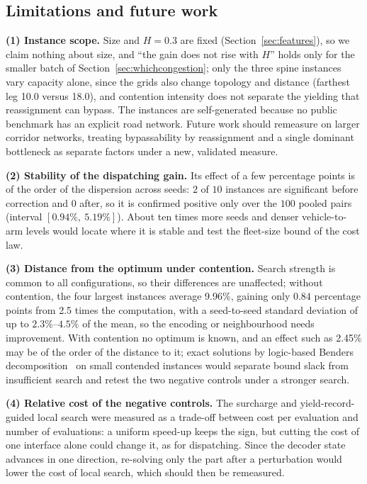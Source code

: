 \documentclass[preprint,review,12pt,authoryear]{elsarticle}
\newcommand{\NCases}{10}
\newcommand{\NPairs}{100}
\newcommand{\GainProbeLoop}{2.45\%}      %
\newcommand{\CIProbeLoop}{$[0.94\%,\ 5.19\%]$}
\newcommand{\CellsSigProbe}{2}
\newcommand{\CellsSigProbeAdj}{0}
\newcommand{\LegDumbbell}{10.0}          %
\newcommand{\LegGrid}{18.0}              %
\newcommand{\PubGapBig}{9.96\%}           %
\newcommand{\PubBudgetRatio}{2.5}
\newcommand{\PubBudgetGainPP}{0.84}       %
\newcommand{\PubCvBig}{$2.3\%$--$4.5\%$} %
\begin{document}
\subsection{Limitations and future work}
\label{sec:limitations}
\label{sec:future_work}

\textbf{(1) Instance scope.}
Size and $H=0.3$ are fixed (Section~\ref{sec:features}), so we claim nothing about size, and ``the gain does not rise with $H$'' holds only for the smaller batch of Section~\ref{sec:whichcongestion}; only the three spine instances vary capacity alone, since the grids also change topology and distance (farthest leg \LegDumbbell{} versus \LegGrid{}), and contention intensity does not separate the yielding that reassignment can bypass. The instances are self-generated because no public benchmark has an explicit road network. Future work should remeasure on larger corridor networks, treating bypassability by reassignment and a single dominant bottleneck as separate factors under a new, validated measure.

\textbf{(2) Stability of the dispatching gain.}
Its effect of a few percentage points is of the order of the dispersion across seeds: $\CellsSigProbe$ of $\NCases$ instances are significant before correction and $\CellsSigProbeAdj$ after, so it is confirmed positive only over the $\NPairs$ pooled pairs (interval \CIProbeLoop{}). About ten times more seeds and denser vehicle-to-arm levels would locate where it is stable and test the fleet-size bound of the cost law.

\textbf{(3) Distance from the optimum under contention.}
Search strength is common to all configurations, so their differences are unaffected; without contention, the four largest instances average \PubGapBig{}, gaining only $\PubBudgetGainPP$ percentage points from \PubBudgetRatio{} times the computation, with a seed-to-seed standard deviation of up to \PubCvBig{} of the mean, so the encoding or neighbourhood needs improvement. With contention no optimum is known, and an effect such as \GainProbeLoop{} may be of the order of the distance to it; exact solutions by logic-based Benders decomposition~\citep{vanos2026exact} on small contended instances would separate bound slack from insufficient search and retest the two negative controls under a stronger search.

\textbf{(4) Relative cost of the negative controls.}
The surcharge and yield-record-guided local search were measured as a trade-off between cost per evaluation and number of evaluations: a uniform speed-up keeps the sign, but cutting the cost of one interface alone could change it, as for dispatching. Since the decoder state advances in one direction, re-solving only the part after a perturbation would lower the cost of local search, which should then be remeasured.
\end{document}

